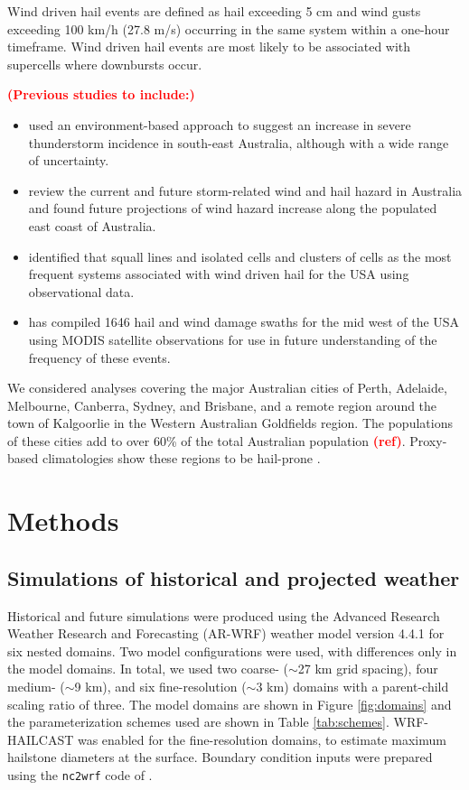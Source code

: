 \documentclass[]{agujournal2019}\usepackage[]{graphicx}\usepackage[]{xcolor}
\newcommand*{\todo}[1]{\textbf{\textcolor{red}{(#1)}}}
\newcommand*{\mref}{\todo{ref}}
\begin{document}
Wind driven hail events are defined as hail exceeding 5 cm and wind gusts exceeding 100 km/h (27.8 m/s) occurring in the same system within a one-hour timeframe. Wind driven hail events are most likely to be associated with supercells where downbursts occur. 

\todo{Previous studies to include:}
\begin{itemize}
\item \cite{Allen_JC_2014} used an environment-based approach to suggest an increase in severe thunderstorm incidence in south-east Australia, although with a wide range of uncertainty.
\item \cite{Walsh_CC_2016} review the current and future storm-related wind and hail hazard in Australia and found future projections of wind hazard increase along the populated east coast of Australia.
\item \cite{Carletta_2010} identified that squall lines and isolated cells and clusters of cells as the most frequent systems associated with wind driven hail for the USA using observational data.
\item \cite{Bell_WF_2023} has compiled 1646 hail and wind damage swaths for the mid west of the USA using MODIS satellite observations for use in future understanding of the frequency of these events.
\end{itemize}

We considered analyses covering the major Australian cities of Perth, Adelaide, Melbourne, Canberra, Sydney, and Brisbane, and a remote region around the town of Kalgoorlie in the Western Australian Goldfields region. The populations of these cities add to over 60\% of the total Australian population \mref{}. Proxy-based climatologies show these regions to be hail-prone \cite{Raupach_npjCAS_2023}.

\section{Methods}

\subsection{Simulations of historical and projected weather}

Historical and future simulations were produced using the Advanced Research Weather Research and Forecasting (AR-WRF) weather model version 4.4.1 \cite{Skamarock_2021} for six nested domains. Two model configurations were used, with differences only in the model domains. In total, we used two coarse- ($\sim$27 km grid spacing), four medium- ($\sim$9 km), and six fine-resolution ($\sim$3 km) domains with a parent-child scaling ratio of three. The model domains are shown in Figure \ref{fig:domains} and the parameterization schemes used are shown in Table \ref{tab:schemes}. WRF-HAILCAST \cite{Adams-Selin_WF_2019} was enabled for the fine-resolution domains, to estimate maximum hailstone diameters at the surface. Boundary condition inputs were prepared using the \texttt{nc2wrf} code of .
\end{document}
